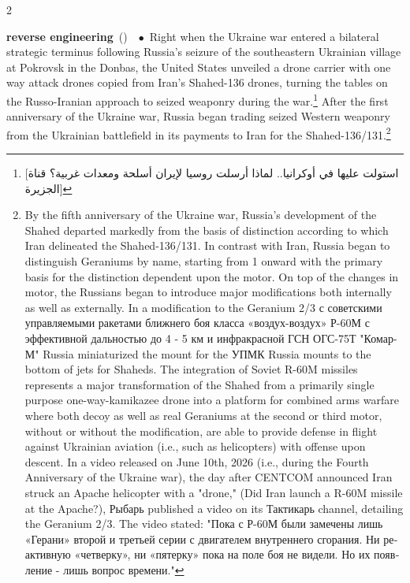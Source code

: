 \documentclass[10pt,a4paper,twoside]{article} %
\newcommand{\entry}[4]{\markboth{#1}{#1}\textbf{#1}\ {(#2)}\ \textit{#3}\ $\bullet$\ {#4}}  %
\begin{document}
\begin{multicols}{2}
\entry{reverse engineering} {} {} {Right when the Ukraine war entered a bilateral strategic terminus following Russia's seizure of the southeastern Ukrainian village at Pokrovsk in the Donbas, the United States unveiled a drone carrier with one way attack drones copied from Iran's Shahed-136 drones, turning the tables on the Russo-Iranian approach to seized weaponry during the war.\footnote{[استولت عليها في أوكرانيا.. لماذا أرسلت روسيا لإيران أسلحة ومعدات غربية؟ قناة الجزيرة]} After the first anniversary of the Ukraine war, Russia began trading seized Western weaponry from the Ukrainian battlefield in its payments to Iran for the Shahed-136/131.\footnote{By the fifth anniversary of the Ukraine war, Russia's development of the Shahed departed markedly from the basis of distinction according to which Iran delineated the Shahed-136/131. In contrast with Iran, Russia began to distinguish Geraniums by name, starting from 1 onward with the primary basis for the distinction dependent upon the motor. 
On top of the changes in motor, the Russians began to introduce major modifications both internally as well as externally. In a modification to the Geranium 2/3 \textrussian{с советскими управляемыми ракетами ближнего боя класса «воздух-воздух» Р-60М с эффективной дальностью до 4 - 5 км и инфракрасной ГСН ОГС-75Т "Комар-М"} Russia miniaturized the mount for the \textrussian{УПМК} Russia mounts to the bottom of jets for Shaheds. The integration of Soviet R-60M missiles represents a major transformation of the Shahed from a primarily single purpose one-way-kamikazee drone into a platform for combined arms warfare where both decoy as well as real Geraniums at the second or third motor, without or without the modification, are able to provide defense in flight against Ukrainian aviation (i.e., such as helicopters) with offense upon descent. In a video released on June 10th, 2026 (i.e., during the Fourth Anniversary of the Ukraine war), the day after CENTCOM announced Iran struck an Apache helicopter with a "drone," (Did Iran launch a R-60M missile at the Apache?), \textrussian{Рыбарь} published a video on its \textrussian{Тактикарь} channel, detailing the Geranium 2/3. The video stated: "\textrussian{Пока с Р-60М были замечены лишь «Герани» второй и третьей серии с двигателем внутреннего сгорания. Ни реактивную «четверку», ни «пятерку» пока на поле боя не видели. Но их появление - лишь вопрос времени.}"}
}
\end{multicols}
\end{document}

